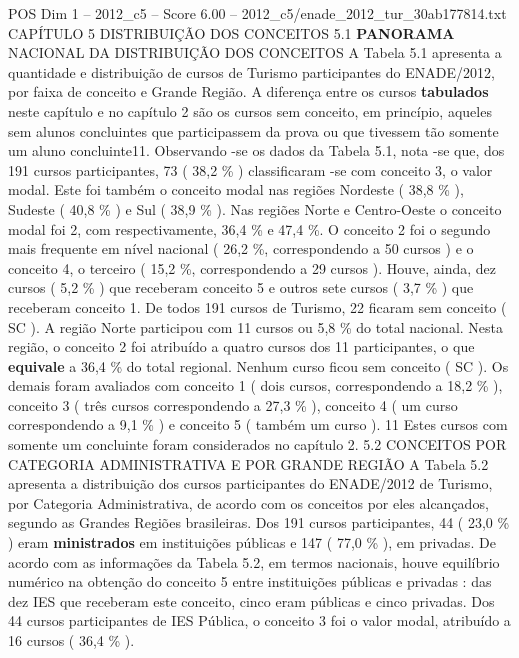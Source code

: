 \begin{textsample}{POS Dim 1 – 2012\_c5 – Score 6.00 – 2012\_c5/enade\_2012\_tur\_30ab177814.txt}  \label{ex:f1_pos_119}
CAPÍTULO 5 DISTRIBUIÇÃO DOS CONCEITOS 5.1 \textbf{PANORAMA} NACIONAL DA DISTRIBUIÇÃO DOS CONCEITOS A Tabela 5.1 apresenta a quantidade e distribuição de cursos de Turismo participantes do ENADE/2012, por faixa de conceito e Grande Região.
A diferença entre os cursos \textbf{tabulados} neste capítulo e no capítulo 2 são os cursos sem conceito, em princípio, aqueles sem alunos concluintes que participassem da prova ou que tivessem tão somente um aluno concluinte11.
Observando -se os dados da Tabela 5.1, nota -se que, dos 191 cursos participantes, 73 ( 38,2 \% ) classificaram -se com conceito 3, o valor modal.
Este foi também o conceito modal nas regiões Nordeste ( 38,8 \% ), Sudeste ( 40,8 \% ) e Sul ( 38,9 \% ).
Nas regiões Norte e Centro-Oeste o conceito modal foi 2, com respectivamente, 36,4 \% e 47,4 \%.
O conceito 2 foi o segundo mais frequente em nível nacional ( 26,2 \%, correspondendo a 50 cursos ) e o conceito 4, o terceiro ( 15,2 \%, correspondendo a 29 cursos ).
Houve, ainda, dez cursos ( 5,2 \% ) que receberam conceito 5 e outros sete cursos ( 3,7 \% ) que receberam conceito 1.
De todos 191 cursos de Turismo, 22 ficaram sem conceito ( SC ).
A região Norte participou com 11 cursos ou 5,8 \% do total nacional.
Nesta região, o conceito 2 foi atribuído a quatro cursos dos 11 participantes, o que \textbf{equivale} a 36,4 \% do total regional.
Nenhum curso ficou sem conceito ( SC ).
Os demais foram avaliados com conceito 1 ( dois cursos, correspondendo a 18,2 \% ), conceito 3 ( três cursos correspondendo a 27,3 \% ), conceito 4 ( um curso correspondendo a 9,1 \% ) e conceito 5 ( também um curso ). 11 Estes cursos com somente um concluinte foram considerados no capítulo 2. 5.2 CONCEITOS POR CATEGORIA ADMINISTRATIVA E POR GRANDE REGIÃO A Tabela 5.2 apresenta a distribuição dos cursos participantes do ENADE/2012 de Turismo, por Categoria Administrativa, de acordo com os conceitos por eles alcançados, segundo as Grandes Regiões brasileiras.
Dos 191 cursos participantes, 44 ( 23,0 \% ) eram \textbf{ministrados} em instituições públicas e 147 ( 77,0 \% ), em privadas.
De acordo com as informações da Tabela 5.2, em termos nacionais, houve equilíbrio numérico na obtenção do conceito 5 entre instituições públicas e privadas : das dez IES que receberam este conceito, cinco eram públicas e cinco privadas.
Dos 44 cursos participantes de IES Pública, o conceito 3 foi o valor modal, atribuído a 16 cursos ( 36,4 \% ).

\end{textsample}
